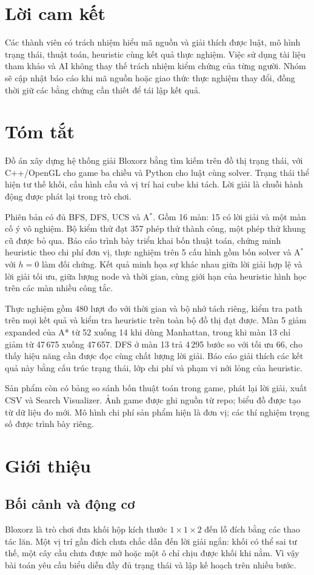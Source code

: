 \documentclass[a4paper]{article}
\newcommand{\astar}{\texorpdfstring{A\ensuremath{^*}}{A*}}
\newcommand{\frontmatterheading}[1]{\section*{#1}}
\begin{document}
\frontmatterheading{Lời cam kết}
Các thành viên có trách nhiệm hiểu mã nguồn và giải thích được luật, mô hình trạng thái, thuật toán, heuristic cùng kết quả thực nghiệm. Việc sử dụng tài liệu tham khảo và AI không thay thế trách nhiệm kiểm chứng của từng người. Nhóm sẽ cập nhật báo cáo khi mã nguồn hoặc giao thức thực nghiệm thay đổi, đồng thời giữ các bằng chứng cần thiết để tái lập kết quả.


\frontmatterheading{Tóm tắt}
Đồ án xây dựng hệ thống giải Bloxorz bằng tìm kiếm trên đồ thị trạng thái, với C++/OpenGL cho game ba chiều và Python cho luật cùng solver. Trạng thái thể hiện tư thế khối, cấu hình cầu và vị trí hai cube khi tách. Lời giải là chuỗi hành động được phát lại trong trò chơi.

Phiên bản có đủ BFS, DFS, UCS và \astar{}. Gồm 16 màn: 15 có lời giải và một màn cố ý vô nghiệm. Bộ kiểm thử đạt 357 phép thử thành công, một phép thử khung cũ được bỏ qua. Báo cáo trình bày triển khai bốn thuật toán, chứng minh heuristic theo chi phí đơn vị, thực nghiệm trên 5 cấu hình gồm bốn solver và \astar{} với $h=0$ làm đối chứng. Kết quả minh họa sự khác nhau giữa lời giải hợp lệ và lời giải tối ưu, giữa lượng node và thời gian, cùng giới hạn của heuristic hình học trên các màn nhiều công tắc.

Thực nghiệm gồm 480 lượt đo với thời gian và bộ nhớ tách riêng, kiểm tra path trên mọi kết quả và kiểm tra heuristic trên toàn bộ đồ thị đạt được. Màn 5 giảm expanded của A* từ 52 xuống 14 khi dùng Manhattan, trong khi màn 13 chỉ giảm từ 47\,675 xuống 47\,657. DFS ở màn 13 trả 4\,295 bước so với tối ưu 66, cho thấy hiệu năng cần được đọc cùng chất lượng lời giải. Báo cáo giải thích các kết quả này bằng cấu trúc trạng thái, lớp chi phí và phạm vi nới lỏng của heuristic.

Sản phẩm còn có bảng so sánh bốn thuật toán trong game, phát lại lời giải, xuất CSV và Search Visualizer. Ảnh game được ghi nguồn từ repo; biểu đồ được tạo từ dữ liệu đo mới. Mô hình chi phí sản phẩm hiện là đơn vị; các thí nghiệm trọng số được trình bày riêng. 

\newpage

\section{Giới thiệu}
\subsection{Bối cảnh và động cơ}
Bloxorz là trò chơi đưa khối hộp kích thước $1\times1\times2$ đến lỗ đích bằng các thao tác lăn. Một vị trí gần đích chưa chắc dẫn đến lời giải ngắn: khối có thể sai tư thế, một cây cầu chưa được mở hoặc một ô chỉ chịu được khối khi nằm. Vì vậy bài toán yêu cầu biểu diễn đầy đủ trạng thái và lập kế hoạch trên nhiều bước.
\end{document}
